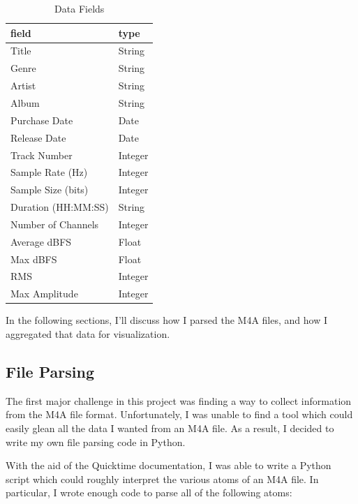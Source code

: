 \documentclass[journal]{vgtc}                %
\begin{document}
\begin{table}[h]
  \caption{Data Fields}
  \label{tab:fields}
  \scriptsize%
	\centering%
  \begin{tabu}{l l}
  \toprule
    field & type \\
  \midrule
  Title & String \\
  Genre & String \\
  Artist & String \\
  Album & String \\
  Purchase Date & Date \\
  Release Date & Date \\
  Track Number & Integer \\
  Sample Rate (Hz) & Integer \\
  Sample Size (bits) & Integer \\
  Duration (HH:MM:SS) & String \\
  Number of Channels & Integer \\
  Average dBFS & Float \\
  Max dBFS & Float \\
  RMS & Integer \\
  Max Amplitude & Integer \\
  \midrule
  \end{tabu}%
\end{table}

In the following sections, I'll discuss how I parsed the M4A files, and how
I aggregated that data for visualization.

\subsection{File Parsing}

The first major challenge in this project was finding a way to collect
information from the M4A file format. Unfortunately, I was unable to find a
tool which could easily glean all the data I wanted from an M4A file. As a result,
I decided to write my own file parsing code in Python.

With the aid of the Quicktime documentation, I was able to write a Python script
which could roughly interpret the various atoms of an M4A file. In particular,
I wrote enough code to parse all of the following atoms:
\end{document}
